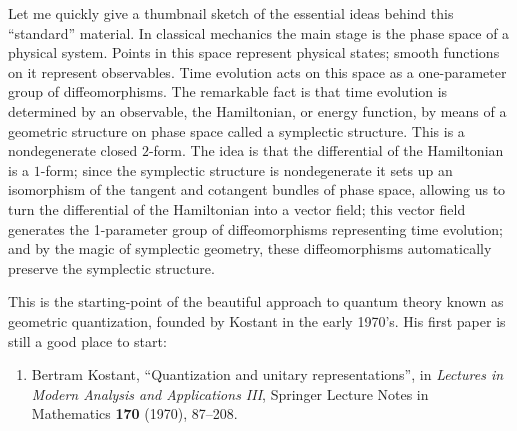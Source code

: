 \documentclass{article}
\def\tightlist{}
\begin{document}
Let me quickly give a thumbnail sketch of the essential ideas behind
this ``standard'' material. In classical mechanics the main stage is the
phase space of a physical system. Points in this space represent
physical states; smooth functions on it represent observables. Time
evolution acts on this space as a one-parameter group of
diffeomorphisms. The remarkable fact is that time evolution is
determined by an observable, the Hamiltonian, or energy function, by
means of a geometric structure on phase space called a symplectic
structure. This is a nondegenerate closed \(2\)-form. The idea is that
the differential of the Hamiltonian is a \(1\)-form; since the
symplectic structure is nondegenerate it sets up an isomorphism of the
tangent and cotangent bundles of phase space, allowing us to turn the
differential of the Hamiltonian into a vector field; this vector field
generates the 1-parameter group of diffeomorphisms representing time
evolution; and by the magic of symplectic geometry, these
diffeomorphisms automatically preserve the symplectic structure.

This is the starting-point of the beautiful approach to quantum theory
known as geometric quantization, founded by Kostant in the early 1970's.
His first paper is still a good place to start:

\begin{enumerate}
\def\labelenumi{\arabic{enumi})}
\setcounter{enumi}{1}
\tightlist
\item
  Bertram Kostant, ``Quantization and unitary representations'', in
  \emph{Lectures in Modern Analysis and Applications III},
  Springer Lecture Notes in Mathematics \textbf{170} (1970),
  87--208.
\end{enumerate}
\end{document}
